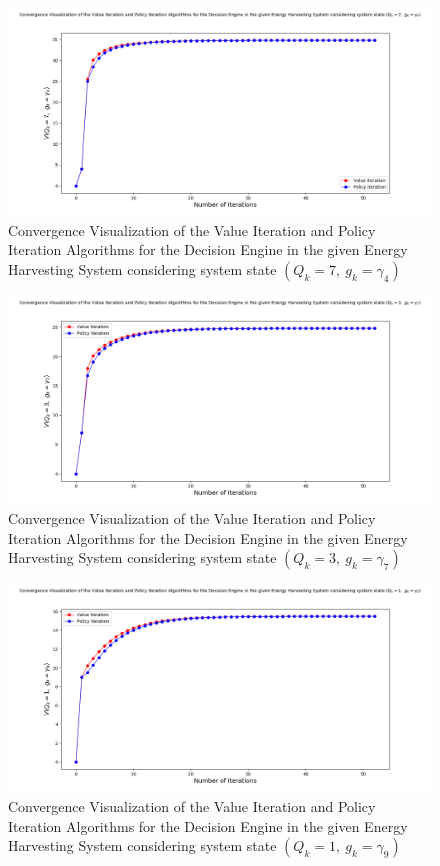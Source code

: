\documentclass[12pt, draftcls, onecolumn]{IEEEtran}
\begin{document}
\begin{figure}[t]
\includegraphics[width=1.0\textwidth]{Convergence_Analysis_Energy_Harvesting_Node_Increased_Confidence_7_4.png}
\caption{Convergence Visualization of the Value Iteration and Policy Iteration Algorithms for the Decision Engine in the given Energy Harvesting System considering system state $(Q_k=7,\ g_k=\gamma_{4})$}
\label{fig:mesh3}
\centering
\end{figure}
\begin{figure}[t]
\includegraphics[width=1.0\textwidth]{Convergence_Analysis_Energy_Harvesting_Node_Increased_Confidence_3_7.png}
\caption{Convergence Visualization of the Value Iteration and Policy Iteration Algorithms for the Decision Engine in the given Energy Harvesting System considering system state $(Q_k=3,\ g_k=\gamma_{7})$}
\label{fig:mesh4}
\centering
\end{figure}
\begin{figure}[t]
\includegraphics[width=1.0\textwidth]{Convergence_Analysis_Energy_Harvesting_Node_Increased_Confidence_1_9.png}
\caption{Convergence Visualization of the Value Iteration and Policy Iteration Algorithms for the Decision Engine in the given Energy Harvesting System considering system state $(Q_k=1,\ g_k=\gamma_{9})$}
\label{fig:mesh5}
\centering
\end{figure}
\end{document}
